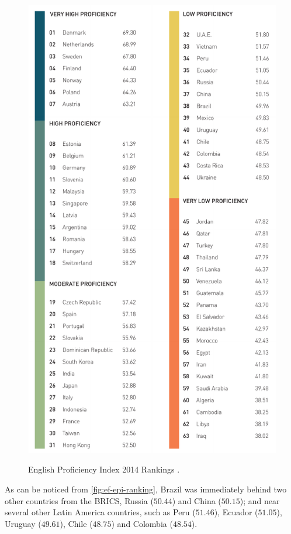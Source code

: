 \begin{figure}[!htpb]
        \myfloatalign
        {\includegraphics[width=1.0\linewidth]{gfx/ef-epi-ranking-2014.pdf}}
        \caption{English Proficiency Index 2014 Rankings \cite{EF2014}.}
        \label{fig:ef-epi-ranking}
\end{figure}

As can be noticed from \autoref{fig:ef-epi-ranking}, Brazil was immediately behind two other countries from the BRICS, Russia ($50.44$) and China ($50.15$); and near several other Latin America countries, such as Peru ($51.46$), Ecuador ($51.05$), Uruguay ($49.61$), Chile ($48.75$) and Colombia ($48.54$). 

